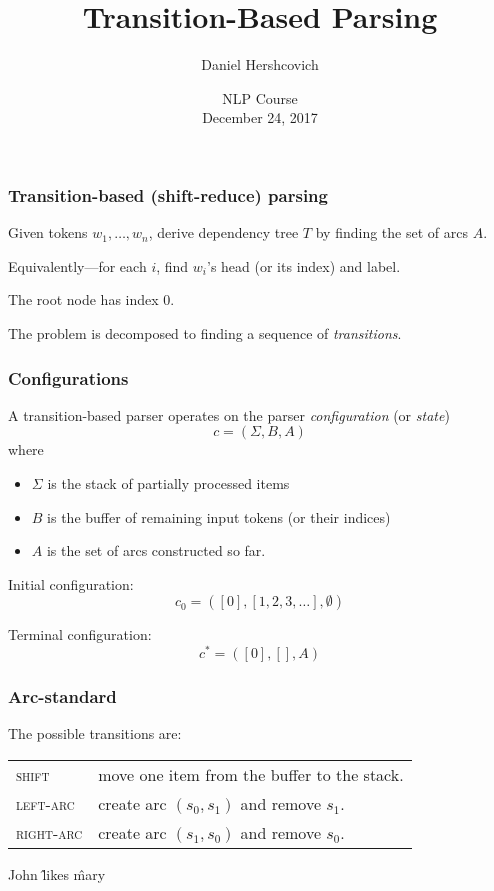 \documentclass[t]{beamer}
\title{Transition-Based Parsing}
\author{Daniel Hershcovich}
\date{NLP Course \\ December 24, 2017}
\begin{document}
\begin{frame}
\titlepage
\end{frame}



\begin{frame}
  \frametitle{Transition-based (shift-reduce) parsing}
  Given tokens $w_1, \ldots, w_n$, derive dependency tree $T$ by finding the set of arcs $A$.

  Equivalently---for each $i$, find $w_i$'s head (or its index) and label.

  The root node has index 0.

  The problem is decomposed to finding a sequence of \textit{transitions}.
\end{frame}

\begin{frame}
  \frametitle{Configurations}
  A transition-based parser operates on the parser \textit{configuration} (or \textit{state})
  \[
    c = (\Sigma, B, A)
  \]
  where
  \begin{itemize}
    \item $\Sigma$ is the stack of partially processed items
    \item $B$ is the buffer of remaining input tokens (or their indices)
    \item $A$ is the set of arcs constructed so far.
  \end{itemize}

  \vfill

  Initial configuration:
  \[
    c_0 = ([0], [1, 2, 3, \ldots], \emptyset)
  \]

  Terminal configuration:
  \[
    c^* = ([0], [], A)
  \]
\end{frame}

\begin{frame}
  \frametitle{Arc-standard}
  The possible transitions are:

  \begin{tabular}{ll}
    \textsc{shift} & move one item from the buffer to the stack. \\
    \textsc{left-arc} & create arc $(s_0, s_1)$ and remove $s_1$. \\
    \textsc{right-arc} & create arc $(s_1, s_0)$ and remove $s_0$.
  \end{tabular}
  \begin{center}
    \begin{dependency}
      \begin{deptext}[column sep=1.5em,ampersand replacement=\^,font=\rmfamily]
        John \^ likes \^ mary \\
      \end{deptext}
    \end{dependency}
  \end{center}
\end{frame}
\end{document}
